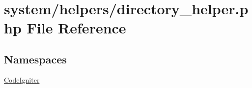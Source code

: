 \hypertarget{directory__helper_8php}{\section{system/helpers/directory\-\_\-helper.php File Reference}
\label{directory__helper_8php}
}
\subsection*{Namespaces}
\begin{DoxyCompactItemize}
\item 
\hyperlink{namespace_code_igniter}{Code\-Igniter}
\end{DoxyCompactItemize}
